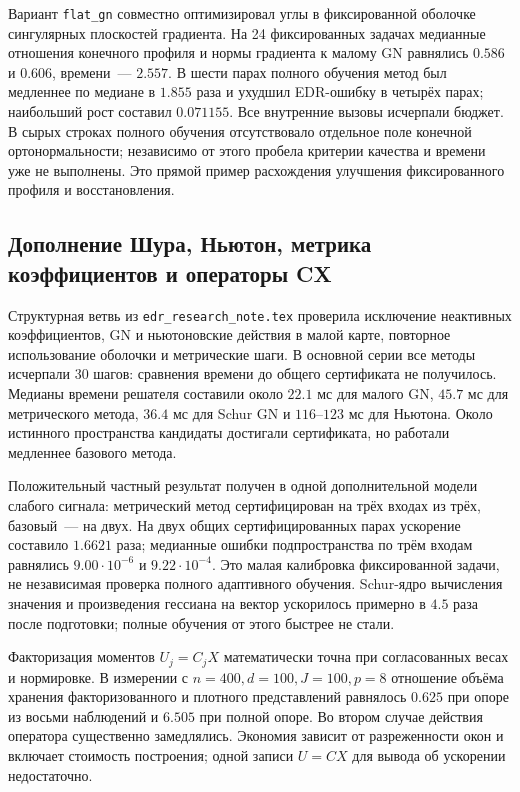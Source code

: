 \documentclass[11pt,a4paper]{article}
\numberwithin{equation}{section}
\newcommand{\file}[1]{\nolinkurl{#1}}
\begin{document}
Вариант \file{flat_gn} совместно оптимизировал углы в фиксированной
оболочке сингулярных плоскостей градиента. На 24 фиксированных задачах
медианные отношения конечного профиля и нормы градиента к малому GN
равнялись $0.586$ и $0.606$, времени~--- $2.557$.
В шести парах полного обучения метод был медленнее по медиане
в $1.855$ раза и ухудшил EDR-ошибку в четырёх парах;
наибольший рост составил $0.071155$.
Все внутренние вызовы исчерпали бюджет. В сырых строках полного
обучения отсутствовало отдельное поле конечной ортонормальности;
независимо от этого пробела критерии качества и времени уже не выполнены.
Это прямой пример расхождения улучшения фиксированного профиля
и восстановления.\cite{flat}

\subsection{Дополнение Шура, Ньютон, метрика коэффициентов и операторы CX}

Структурная ветвь из \file{edr_research_note.tex} проверила
исключение неактивных коэффициентов, GN и ньютоновские действия
в малой карте, повторное использование оболочки и метрические шаги.
В основной серии все методы исчерпали 30 шагов: сравнения времени
до общего сертификата не получилось. Медианы времени решателя
составили около $22.1$ мс для малого GN, $45.7$ мс для метрического
метода, $36.4$ мс для Schur GN и $116$--$123$ мс для Ньютона.
Около истинного пространства кандидаты достигали сертификата,
но работали медленнее базового метода.

Положительный частный результат получен в одной дополнительной
модели слабого сигнала: метрический метод сертифицирован на трёх
входах из трёх, базовый~--- на двух. На двух общих сертифицированных
парах ускорение составило $1.6621$ раза; медианные ошибки подпространства
по трём входам равнялись $9.00\cdot10^{-6}$ и $9.22\cdot10^{-4}$.
Это малая калибровка фиксированной задачи, не независимая проверка
полного адаптивного обучения. Schur-ядро вычисления значения
и произведения гессиана на вектор ускорилось примерно в $4.5$ раза
после подготовки; полные обучения от этого быстрее не стали.

Факторизация моментов $U_j=C_jX$ математически точна при согласованных
весах и нормировке. В измерении с $n=400,d=100,J=100,p=8$
отношение объёма хранения факторизованного и плотного представлений
равнялось $0.625$ при опоре из восьми наблюдений и $6.505$
при полной опоре. Во втором случае действия оператора существенно
замедлялись. Экономия зависит от разреженности окон и включает
стоимость построения; одной записи $U=CX$ для вывода об ускорении
недостаточно.\cite{structured}
\end{document}
